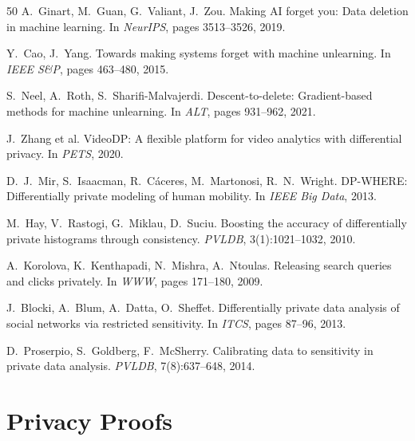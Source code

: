 \documentclass[sigconf,anonymous,review]{acmart}
\begin{document}
\begin{thebibliography}{50}
    A.~Ginart, M.~Guan, G.~Valiant, J.~Zou.
    \newblock Making AI forget you: Data deletion in machine learning.
    \newblock In \emph{NeurIPS}, pages 3513--3526, 2019.

    Y.~Cao, J.~Yang.
    \newblock Towards making systems forget with machine unlearning.
    \newblock In \emph{IEEE S\&P}, pages 463--480, 2015.

    S.~Neel, A.~Roth, S.~Sharifi-Malvajerdi.
    \newblock Descent-to-delete: Gradient-based methods for machine unlearning.
    \newblock In \emph{ALT}, pages 931--962, 2021.

    J.~Zhang et al.
    \newblock VideoDP: A flexible platform for video analytics with differential privacy.
    \newblock In \emph{PETS}, 2020.

    D.~J.~Mir, S.~Isaacman, R.~Cáceres, M.~Martonosi, R.~N.~Wright.
    \newblock DP-WHERE: Differentially private modeling of human mobility.
    \newblock In \emph{IEEE Big Data}, 2013.

    M.~Hay, V.~Rastogi, G.~Miklau, D.~Suciu.
    \newblock Boosting the accuracy of differentially private histograms through consistency.
    \newblock \emph{PVLDB}, 3(1):1021--1032, 2010.

    A.~Korolova, K.~Kenthapadi, N.~Mishra, A.~Ntoulas.
    \newblock Releasing search queries and clicks privately.
    \newblock In \emph{WWW}, pages 171--180, 2009.

    J.~Blocki, A.~Blum, A.~Datta, O.~Sheffet.
    \newblock Differentially private data analysis of social networks via restricted sensitivity.
    \newblock In \emph{ITCS}, pages 87--96, 2013.

    D.~Proserpio, S.~Goldberg, F.~McSherry.
    \newblock Calibrating data to sensitivity in private data analysis.
    \newblock \emph{PVLDB}, 7(8):637--648, 2014.

\end{thebibliography}

\section{Privacy Proofs}
\label{app:proofs}
\end{document}
